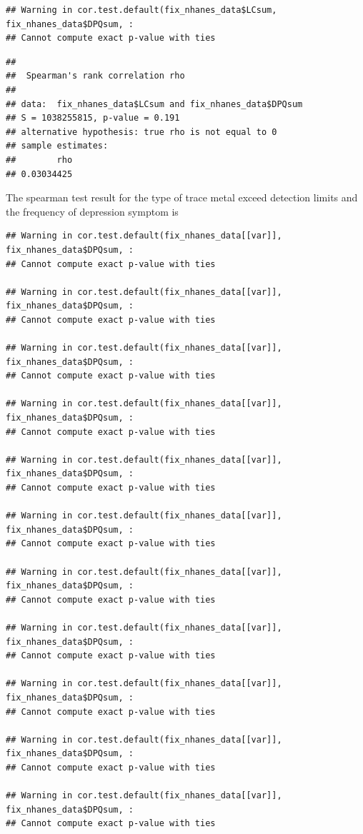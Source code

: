 \documentclass[
  man]{apa6}
\begin{document}
\begin{verbatim}
## Warning in cor.test.default(fix_nhanes_data$LCsum, fix_nhanes_data$DPQsum, :
## Cannot compute exact p-value with ties
\end{verbatim}

\begin{verbatim}
## 
##  Spearman's rank correlation rho
## 
## data:  fix_nhanes_data$LCsum and fix_nhanes_data$DPQsum
## S = 1038255815, p-value = 0.191
## alternative hypothesis: true rho is not equal to 0
## sample estimates:
##        rho 
## 0.03034425
\end{verbatim}

The spearman test result for the type of trace metal exceed detection limits and the frequency of depression symptom is

\begin{verbatim}
## Warning in cor.test.default(fix_nhanes_data[[var]], fix_nhanes_data$DPQsum, :
## Cannot compute exact p-value with ties

## Warning in cor.test.default(fix_nhanes_data[[var]], fix_nhanes_data$DPQsum, :
## Cannot compute exact p-value with ties

## Warning in cor.test.default(fix_nhanes_data[[var]], fix_nhanes_data$DPQsum, :
## Cannot compute exact p-value with ties

## Warning in cor.test.default(fix_nhanes_data[[var]], fix_nhanes_data$DPQsum, :
## Cannot compute exact p-value with ties

## Warning in cor.test.default(fix_nhanes_data[[var]], fix_nhanes_data$DPQsum, :
## Cannot compute exact p-value with ties

## Warning in cor.test.default(fix_nhanes_data[[var]], fix_nhanes_data$DPQsum, :
## Cannot compute exact p-value with ties

## Warning in cor.test.default(fix_nhanes_data[[var]], fix_nhanes_data$DPQsum, :
## Cannot compute exact p-value with ties

## Warning in cor.test.default(fix_nhanes_data[[var]], fix_nhanes_data$DPQsum, :
## Cannot compute exact p-value with ties

## Warning in cor.test.default(fix_nhanes_data[[var]], fix_nhanes_data$DPQsum, :
## Cannot compute exact p-value with ties

## Warning in cor.test.default(fix_nhanes_data[[var]], fix_nhanes_data$DPQsum, :
## Cannot compute exact p-value with ties

## Warning in cor.test.default(fix_nhanes_data[[var]], fix_nhanes_data$DPQsum, :
## Cannot compute exact p-value with ties
\end{verbatim}
\end{document}
